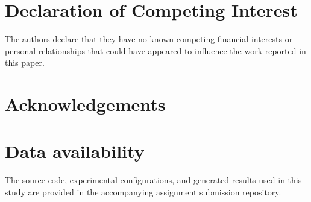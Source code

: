 \documentclass[review]{elsarticle}
\begin{document}
\section*{Declaration of Competing Interest}

The authors declare that they have no known competing financial
interests or personal relationships that could have appeared to
influence the work reported in this paper.


\section*{Acknowledgements}



\section*{Data availability}

The source code, experimental configurations, and generated results
used in this study are provided in the accompanying assignment
submission repository.






\end{document}
